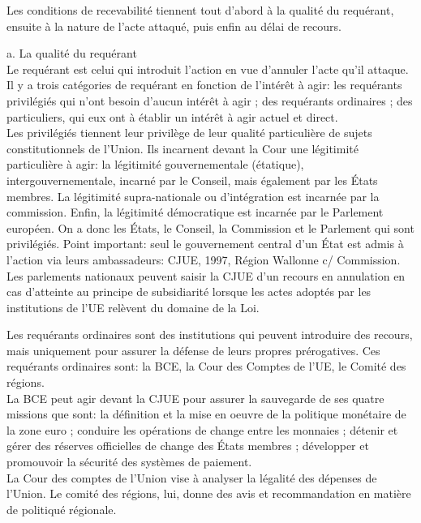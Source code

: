 \documentclass[10pt, a4paper, openany]{book}
\begin{document}
Les conditions de recevabilité tiennent tout d'abord à la qualité du requérant, ensuite à la nature de l'acte attaqué, puis enfin au délai de recours.


a. La qualité du requérant \\
Le requérant est celui qui introduit l'action en vue d'annuler l'acte qu'il attaque. Il y a trois catégories de requérant en fonction de l'intérêt à agir: les requérants privilégiés qui n'ont besoin d'aucun intérêt à agir ; des requérants ordinaires ; des particuliers, qui eux ont à établir un intérêt à agir actuel et direct. \\
Les privilégiés tiennent leur privilège de leur qualité particulière de sujets constitutionnels de l'Union. Ils incarnent devant la Cour une légitimité particulière à agir: la légitimité gouvernementale (étatique), intergouvernementale, incarné par le Conseil, mais également par les États membres. La légitimité supra-nationale ou d'intégration est incarnée par la commission. Enfin, la légitimité démocratique est incarnée par le Parlement européen. On a donc les États, le Conseil, la Commission et le Parlement qui sont privilégiés. Point important: seul le gouvernement central d'un État est admis à l'action via leurs ambassadeurs: CJUE, 1997, Région Wallonne c/ Commission. \\
Les parlements nationaux peuvent saisir la CJUE d'un recours en annulation en cas d'atteinte au principe de subsidiarité lorsque les actes adoptés par les institutions de l'UE relèvent du domaine de la Loi. 


Les requérants ordinaires sont des institutions qui peuvent introduire des recours, mais uniquement pour assurer la défense de leurs propres prérogatives. Ces requérants ordinaires sont: la BCE, la Cour des Comptes de l'UE, le Comité des régions. \\
La BCE peut agir devant la CJUE pour assurer la sauvegarde de ses quatre missions que sont: la définition et la mise en oeuvre de la politique monétaire de la zone euro ; conduire les opérations de change entre les monnaies ; détenir et gérer des réserves officielles de change des États membres ; développer et promouvoir la sécurité des systèmes de paiement. \\
La Cour des comptes de l'Union vise à analyser la légalité des dépenses de l'Union. Le comité des régions, lui, donne des avis et recommandation en matière de politiqué régionale.
\end{document}
